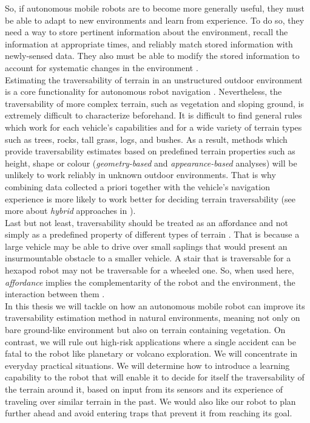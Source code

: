 \documentclass[12pt,a4paper,table,dvipsnames,tikz]{report}
\newcommand{\term}{\textit}
\begin{document}
	So, if autonomous mobile robots are to become more generally useful, they must 
	be able to adapt to new environments and learn from experience. To do so, they 
	need a way to store pertinent information about the environment, recall the 
	information at appropriate times, and reliably match stored information with 
	newly-sensed data. They also must be able to modify the stored information to 
	account for systematic changes in the environment \citep{Shneier}.
	\\
	
	Estimating the traversability of terrain in an unstructured outdoor 
	environment is a core functionality for autonomous robot navigation \citep{Kim}. 
	Nevertheless, the traversability of more complex terrain, such as 
	vegetation and sloping ground, is extremely difficult to characterize beforehand. 
	It is difficult to find general rules which work for each vehicle's	capabilities
	and for a wide variety of terrain types such as trees, rocks, tall grass, logs, 
	and bushes. As a result, methods which provide traversability estimates 
	based on predefined terrain properties such as height, shape or colour 
	(\term{geometry-based} and \term{appearance-based} analyses) will be unlikely to 
	work reliably in unknown outdoor environments. That is why combining data 
	collected a priori together with the vehicle’s navigation experience is more 
	likely to work better for deciding terrain traversability (see more about 
	\term{hybrid} approaches in \citet{Papadakis}).
	\\
	
	Last but not least, traversability should be treated as an affordance and 
	not simply as a predefined property of different types of terrain \citep{Kim}. 
	That is because a large vehicle may be able to drive over small saplings that 
	would present an insurmountable obstacle to a smaller vehicle. A stair that is 
	traversable for a hexapod robot may not be traversable for a wheeled one. So, 
	when used here, \term{affordance} implies the complementarity of the robot and 
	the environment, the interaction between them \citep{Ugur}.
	\\
	
	In this thesis we will tackle on how an autonomous mobile robot can improve its 
	traversability estimation method in natural environments, meaning not 
	only on bare ground-like environment but also on terrain containing vegetation. 
	On contrast, we will rule out high-risk applications where a single accident can 
	be fatal to the robot like planetary or volcano exploration. We will concentrate 
	in everyday practical situations. We will determine how to introduce a learning 
	capability to the robot that will enable it to decide for itself the 
	traversability of the terrain around it, based on input from its sensors 
	and its experience of traveling over similar terrain in the past. We would also 
	like our robot to plan further ahead and avoid entering traps that prevent it 
	from reaching its goal.
	\\\\
	
\end{document}
